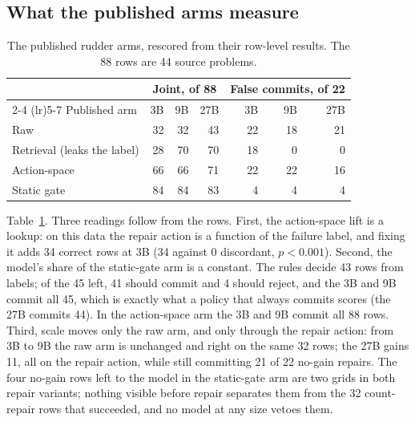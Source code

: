 \documentclass[11pt]{article}
\begin{document}
\subsection{What the published arms measure}

\begin{table}[t]
  \centering
  \small
  \begin{tabular}{lrrrrrr}
    \toprule
    & \multicolumn{3}{c}{Joint, of 88} & \multicolumn{3}{c}{False commits, of 22} \\
    \cmidrule(lr){2-4} \cmidrule(lr){5-7}
    Published arm & \hspace{1.2em}3B & \hspace{1.2em}9B & 27B & \hspace{1.2em}3B & \hspace{1.2em}9B & 27B \\
    \midrule
    Raw & 32 & 32 & 43 & 22 & 18 & 21 \\
    Retrieval (leaks the label) & 28 & 70 & 70 & 18 & 0 & 0 \\
    Action-space & 66 & 66 & 71 & 22 & 22 & 16 \\
    Static gate & 84 & 84 & 83 & 4 & 4 & 4 \\
    \bottomrule
  \end{tabular}
  \caption{The published rudder arms, rescored from their row-level results. The 88 rows are 44 source problems.}
  \label{tab:rudder-pub}
\end{table}

Table~\ref{tab:rudder-pub}. Three readings follow from the rows. First, the action-space lift is a lookup: on this data the repair action is a function of the failure label, and fixing it adds 34 correct rows at 3B (34 against 0 discordant, $p<0.001$). Second, the model's share of the static-gate arm is a constant. The rules decide 43 rows from labels; of the 45 left, 41 should commit and 4 should reject, and the 3B and 9B commit all 45, which is exactly what a policy that always commits scores (the 27B commits 44). In the action-space arm the 3B and 9B commit all 88 rows. Third, scale moves only the raw arm, and only through the repair action: from 3B to 9B the raw arm is unchanged and right on the same 32 rows; the 27B gains 11, all on the repair action, while still committing 21 of 22 no-gain repairs. The four no-gain rows left to the model in the static-gate arm are two grids in both repair variants; nothing visible before repair separates them from the 32 count-repair rows that succeeded, and no model at any size vetoes them.
\end{document}
